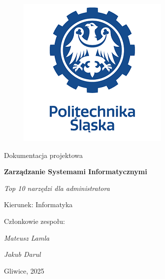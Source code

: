 \documentclass[0.82pt,a4paper]{article}
\def\projectName{Top 10 narzędzi dla administratora}
\def\authorA{Mateusz Lamla}
\def\authorB{Jakub Darul}
\begin{document}
\clearpage
	\begin{figure}[h]
		\centering
		\includegraphics[width=1\linewidth]{media/ps-logo.png}
	\end{figure}

\hspace{3cm}
	\begin{center}Dokumentacja projektowa\end{center}
	\hspace{3cm}
	\begin{center}\large\textbf{Zarządzanie Systemami Informatycznymi}\end{center}
	\begin{center}\large\textit{\projectName}\end{center}

\hspace{7cm}
	\begin{flushright}Kierunek: Informatyka
		\end{flushright}
		\begin{flushright}Członkowie zespołu:
		\par
		\textit{\authorA}
		\par
		\textit{\authorB}
	\end{flushright}
\vfill
	\begin{center}Gliwice, 2025\end{center}
\end{document}

